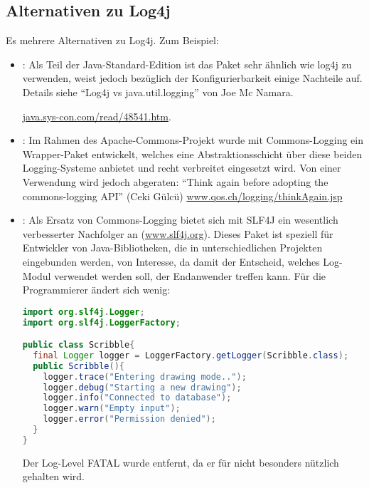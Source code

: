 \subsection{Alternativen zu Log4j}
Es mehrere Alternativen zu Log4j. Zum Beispiel:
\begin{itemize}
\item {}:
Als Teil der Java-Standard-Edition ist das Paket sehr ähnlich wie
log4j zu verwenden, weist jedoch bezüglich der Konfigurierbarkeit einige
 Nachteile auf. Details siehe ``Log4j vs java.util.logging''  von Joe
 Mc Namara.

  \href{http://java.sys-con.com/read/48541.htm}
                {java.sys-con.com/read/48541.htm}.
\newslide
\item {}:
 Im Rahmen des Apache-Commons-Projekt wurde mit Com\-mons-Logging
ein Wrapper-Paket entwickelt, welches
eine Abstraktionsschicht über diese beiden Logging-Systeme anbietet und
recht verbreitet eingesetzt wird. Von einer Verwendung wird
jedoch abgeraten:
``Think again before adopting the commons-logging API'' (Ceki Gülcü)
\href{http://www.qos.ch/logging/thinkAgain.jsp}
  {www.qos.ch/logging/thinkAgain.jsp}
\newslide
\item {}:
Als Ersatz von Commons-Logging bietet sich mit SLF4J
ein wesentlich verbesserter Nachfolger
an (\href{http://www.slf4j.org}{www.slf4j.org}).
Dieses Paket ist speziell für Entwickler von
Java-Bib\-lio\-theken, die in unterschiedlichen Projekten eingebunden
werden, von Interesse, da damit der Entscheid, welches Log-Modul
verwendet werden soll, der Endanwender treffen kann.
\newslide
Für die Programmierer ändert sich wenig:
\begin{lstlisting}[language=java]
import org.slf4j.Logger;
import org.slf4j.LoggerFactory;

public class Scribble{
  final Logger logger = LoggerFactory.getLogger(Scribble.class);
  public Scribble(){
    logger.trace("Entering drawing mode..");
    logger.debug("Starting a new drawing");
    logger.info("Connected to database");
    logger.warn("Empty input");
    logger.error("Permission denied");
  }
}
\end{lstlisting}
Der Log-Level FATAL wurde entfernt, da er für nicht besonders nützlich
gehalten wird.


\end{itemize}
